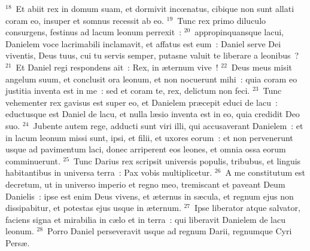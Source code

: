 ${}^{18}$~Et abiit rex in domum suam, et dormivit incœnatus, cibique non sunt allati coram eo, insuper et somnus recessit ab eo.
${}^{19}$~Tunc rex primo diluculo consurgens, festinus ad lacum leonum perrexit~:
${}^{20}$~appropinquansque lacui, Danielem voce lacrimabili inclamavit, et affatus est eum~: Daniel serve Dei viventis, Deus tuus, cui tu servis semper, putasne valuit te liberare a leonibus~?
${}^{21}$~Et Daniel regi respondens ait~: Rex, in \ae ternum vive~!
${}^{22}$~Deus meus misit angelum suum, et conclusit ora leonum, et non nocuerunt mihi~: quia coram eo justitia inventa est in me~: sed et coram te, rex, delictum non feci.
${}^{23}$~Tunc vehementer rex gavisus est super eo, et Danielem pr\ae cepit educi de lacu~: eductusque est Daniel de lacu, et nulla l\ae sio inventa est in eo, quia credidit Deo suo.
${}^{24}$~Jubente autem rege, adducti sunt viri illi, qui accusaverant Danielem~: et in lacum leonum missi sunt, ipsi, et filii, et uxores eorum~: et non pervenerunt usque ad pavimentum laci, donec arriperent eos leones, et omnia ossa eorum comminuerunt.
${}^{25}$~Tunc Darius rex scripsit universis populis, tribubus, et linguis habitantibus in universa terra~: Pax vobis multiplicetur.
${}^{26}$~A me constitutum est decretum, ut in universo imperio et regno meo, tremiscant et paveant Deum Danielis~: ipse est enim Deus vivens, et \ae ternus in s\ae cula, et regnum ejus non dissipabitur, et potestas ejus usque in \ae ternum.
${}^{27}$~Ipse liberator atque salvator, faciens signa et mirabilia in c\ae lo et in terra~: qui liberavit Danielem de lacu leonum.
${}^{28}$~Porro Daniel perseveravit usque ad regnum Darii, regnumque Cyri Pers\ae .

